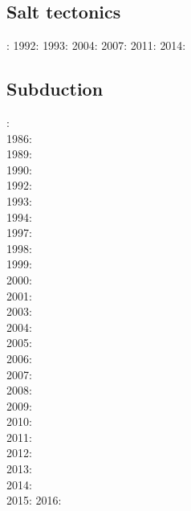 \subsection*{Salt tectonics}

: \cite{tars91}
1992: \cite{zaju92}
1993: \cite{nabr93}
2004: \cite{istt04}
2007: \cite{huja07}
2011: \cite{brfo11}
2014: \cite{bakp14}

\subsection*{Subduction}

: \cite{thar85}\\
1986: \cite{jarr86}\\
1989: \cite{boww89}\\
1990: \cite{hstt90}\\
1992: \cite{zhgu92}\cite{whbw92}\\
1993: \cite{jope93}\cite{dvnm93}\\
1994: \cite{zhgu94}\cite{wibe94}\cite{wdbo94a}\cite{wdbo94b}\\
1997: \cite{hajc97}\\
1998: \cite{itki98}\cite{buwg98}\cite{brmy98}\\
1999: \cite{hagu99}\cite{befo99}\\
2000: \cite{tesc00}\cite{brky00}\\
2001: \cite{bujl01}\\
2003: \cite{refm03}\\
2004: \cite{toba04}\cite{bocj04}\\
2005: \cite{jalo05}\cite{lahb05}\\
2006: \cite{degw06}\cite{rohu06}\\
2007: \cite{artd07}\cite{yaab07}\\
2008: \cite{yaba08}\cite{ozrs08}\cite{dihf08}\cite{wabj08}\cite{wabj08b}\cite{boht08b}\cite{boht08a}\cite{baso08}\\
2009: \cite{yahb09}\cite{bill09}\cite{fagb09}\\
2010: \cite{hagr10}\cite{lobh10}\\
2011: \cite{lixg11}\cite{list11}\cite{bubj11}\cite{bagw11b}\\
2012: \cite{anwb12}\cite{jahu12}\cite{jabi12}\cite{jabk12}\cite{lixg12}\cite{lixg13}\cite{ronb12}\cite{tebu12}\cite{thka12}\cite{bova12}\\
2013: \cite{nabg13}\cite{hage13}\cite{ancv13}\cite{namu13}\cite{yosh13}\cite{zhgt13}\cite{jabr13}\cite{izht13}\cite{luws13}\cite{dusc13}\cite{tibb13}\cite{bubj13}\\
2014: \cite{robn14}\cite{hond14}\cite{ronc14}\\
2015: \cite{bemm15}\cite{bomv15}
2016: \cite{tomy16}


